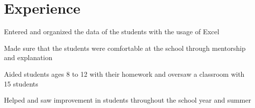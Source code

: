 \section{Experience}

\vspace{-0.5cm}
\begin{tightemize}
\item Entered and organized the data of the students with the usage of Excel
\item Made sure that the students were comfortable at the school through mentorship and explanation
\end{tightemize}
\sectionsep


\vspace{-0.5cm}
\begin{tightemize}
\item Aided students ages 8 to 12 with their homework and oversaw a classroom with 15 students
\item Helped and saw improvement in students throughout the school year and summer
\end{tightemize}